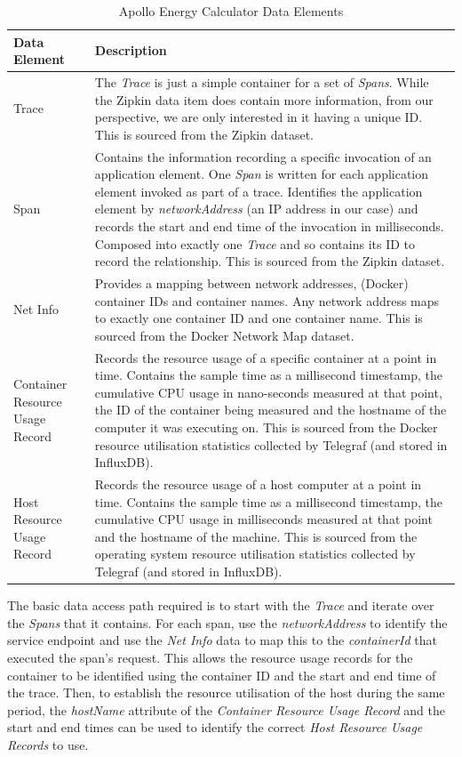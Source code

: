 \begin{table}
\centering
\caption{Apollo Energy Calculator Data Elements}
\label{table:dataelements}
\footnotesize
\begin{tabular}{|p{4cm}|p{9.5cm}|}
\hline
\textbf{Data Element} & \textbf{Description}  \\
\hline
\hline
Trace & The \textit{Trace} is just a simple container for a set of \textit{Spans}.  While the Zipkin data item does contain more information, from our perspective, we are only interested in it having a unique ID.  This is sourced from the Zipkin dataset.\\
\hline
Span & Contains the information recording a specific invocation of an application element.  One \textit{Span} is written for each application element invoked as part of a trace.  Identifies the application element by \textit{networkAddress} (an IP address in our case) and records the start and end time of the invocation in milliseconds.  Composed into exactly one \textit{Trace} and so contains its ID to record the relationship.  This is sourced from the Zipkin dataset. \\
\hline
Net Info & Provides a mapping between network addresses, (Docker) container IDs and container names.  Any network address maps to exactly one container ID and one container name.  This is sourced from the Docker Network Map dataset. \\
\hline
Container Resource Usage Record & Records the resource usage of a specific container at a point in time.  Contains the sample time as a millisecond timestamp, the cumulative CPU usage in nano-seconds measured at that point, the ID of the container being measured and the hostname of the computer it was executing on. This is sourced from the Docker resource utilisation statistics collected by Telegraf (and stored in InfluxDB).\\
\hline
Host Resource Usage Record & Records the resource usage of a host computer at a point in time.  Contains the sample time as a millisecond timestamp, the cumulative CPU usage in milliseconds measured at that point and the hostname of the machine.  This is sourced from the operating system resource utilisation statistics collected by Telegraf (and stored in InfluxDB). \\
\hline
\end{tabular}
\end{table}

The basic data access path required is to start with the \emph{Trace} and iterate over the \emph{Spans} that it contains.  For each span, use the \emph{networkAddress} to identify the service endpoint and use the \emph{Net Info} data to map this to the \emph{containerId} that executed the span's request.  This allows the resource usage records for the container to be identified using the container ID and the start and end time of the trace.  Then, to establish the resource utilisation of the host during the same period, the \emph{hostName} attribute of the \emph{Container Resource Usage Record} and the start and end times can be used to identify the correct \emph{Host Resource Usage Records} to use.


